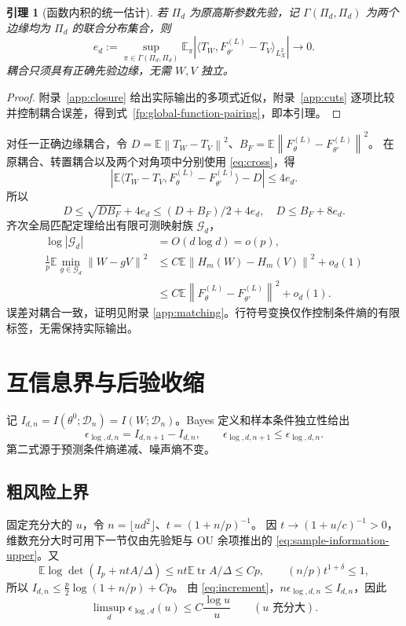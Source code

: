 \documentclass[a4paper]{tufte-handout}
\newtheorem{lemma}{引理}
\newcommand{\E}{\mathbb E}
\newcommand{\norm}[1]{\left\|#1\right\|}
\DeclareMathOperator{\tr}{tr}
\begin{document}
\begin{fullwidth}
\begin{lemma}[函数内积的统一估计]\label{lem:cross}
若 $\Pi_d$ 为原高斯参数先验，记 $\Gamma(\Pi_d,\Pi_d)$ 为两个边缘均为 $\Pi_d$ 的联合分布集合，则
\begin{equation}\label{eq:cross}
e_d:=\sup_{\pi\in\Gamma(\Pi_d,\Pi_d)}
\E_\pi|\langle T_W,F_{\theta'}^{(L)}-T_V\rangle_{L_X^2}|\longrightarrow0.
\end{equation}
耦合只须具有正确先验边缘，无需 $W,V$ 独立。
\end{lemma}
\begin{proof}
附录~\ref{app:closure} 给出实际输出的多项式近似，附录~\ref{app:cuts}
逐项比较并控制耦合误差，得到式~\eqref{fp:global-function-pairing}，即本引理。
\end{proof}

对任一正确边缘耦合，令
$D=\E\norm{T_W-T_V}^2$、$B_F=\E\norm{F_\theta^{(L)}-F_{\theta'}^{(L)}}^2$。
在原耦合、转置耦合以及两个对角项中分别使用 \eqref{eq:cross}，得
\[
|\E\langle T_W-T_V,F_\theta^{(L)}-F_{\theta'}^{(L)}\rangle-D|\le4e_d.
\]
所以
\[
D\le\sqrt{DB_F}+4e_d\le(D+B_F)/2+4e_d,
\quad D\le B_F+8e_d.
\]
齐次全局匹配定理给出有限可测映射族 $\mathcal G_d$，
\begin{equation}\label{eq:matching}\begin{aligned}
\log|\mathcal G_d|&=O(d\log d)=o(p),\\
\frac1p\E\min_{g\in\mathcal G_d}\norm{W-gV}^2
&\le C\E\norm{H_m(W)-H_m(V)}^2+o_d(1)\\
&\le C\E\norm{F_\theta^{(L)}-F_{\theta'}^{(L)}}^2+o_d(1).
\end{aligned}\end{equation}
误差对耦合一致，证明见附录 \ref{app:matching}。行符号变换仅作控制条件熵的有限标签，无需保持实际输出。

\section{互信息界与后验收缩}
记 $I_{d,n}=I(\theta^0;\mathcal D_n)=I(W;\mathcal D_n)$。Bayes 定义和样本条件独立性给出
\begin{equation}\label{eq:increment}
\epsilon_{\log,d,n}=I_{d,n+1}-I_{d,n},\qquad
\epsilon_{\log,d,n+1}\le \epsilon_{\log,d,n}.
\end{equation}
第二式源于预测条件熵递减、噪声熵不变。

\subsection{粗风险上界}
固定充分大的 $u$，令 $n=\lfloor ud^2\rfloor$、$t=(1+n/p)^{-1}$。
因 $t\to(1+u/c)^{-1}>0$，维数充分大时可用下一节仅由先验矩与 OU 余项推出的 \eqref{eq:sample-information-upper}。又
\[
 \E\log\det(I_p+ntA/\Delta)\le nt\E\tr A/\Delta\le Cp,
 \qquad (n/p)t^{1+\delta}\le1,
\]
所以 $I_{d,n}\le\frac p2\log(1+n/p)+Cp$。
由 \eqref{eq:increment}，$n\epsilon_{\log,d,n}\le I_{d,n}$，因此
\begin{equation}\label{eq:coarse}
 \limsup_d\epsilon_{\log,d}(u)\le C\frac{\log u}{u}
 \qquad(u\text{ 充分大}).
\end{equation}


\end{fullwidth}
\end{document}
